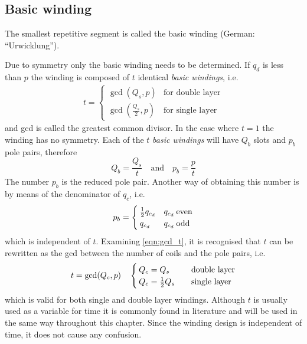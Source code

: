 \subsection{Basic winding}
\begin{defth}
The smallest repetitive segment is called the basic winding (German: ``Urwicklung'').
\end{defth} 
Due to symmetry only the basic winding needs to be determined. If $q_d$ is less than $p$ the winding is composed of $t$ identical \textit{basic windings}, i.e.
\begin{equation}
  \label{eqn:gcd_t}
  \begin{array}{ll}
  t = \begin{cases}
        \gcd\left(Q_s,p\right)  & \text{for double layer}\\
        \gcd\left(\frac{Q_s}{2},p\right) & \text{for single layer}
      \end{cases}
  \end{array}
\end{equation}
and gcd is called the greatest common divisor. In the case where $t=1$ the winding has no symmetry. Each of the $t$ \textit{basic windings} will have $Q_b$ slots and $p_b$ pole pairs, therefore
\begin{equation}
  \label{eqn:qd_pb}
  Q_b = \frac{Q_s}{t} \quad \mbox{and} \quad p_b = \frac{p}{t} 
\end{equation}
The number $p_b$ is the reduced pole pair. Another way of obtaining this number is by means of the denominator of $q_c$, i.e.
\begin{equation}
  \label{eqn:p_b}
  p_b =  
  \begin{cases}
    \frac{1}{2} q_{c_d}  & q_{c_d} \: \textnormal{even} \\
    q_{c_d}  & q_{c_d} \: \textnormal{odd}
  \end{cases}
\end{equation} 
which is independent of $t$. Examining \eqref{eqn:gcd_t}, it is recognised that $t$ can be rewritten as the gcd between the number of coils and the pole pairs, i.e.
\begin{equation}
  \label{eqn:gcd_t_gcd(Qc_p)}
  t = \gcd(Q_c,p) \quad
  \begin{cases}
    Q_c = Q_s \quad & \textnormal{double layer} \\
    Q_c = \frac{1}{2}Q_s \quad & \textnormal{single layer}
  \end{cases}
\end{equation} 
which is valid for both single and double layer windings. Although $t$ is usually used as a variable for time it is commonly found in literature and will be used in the same way throughout this chapter. Since the winding design is independent of time, it does not cause any confusion.

